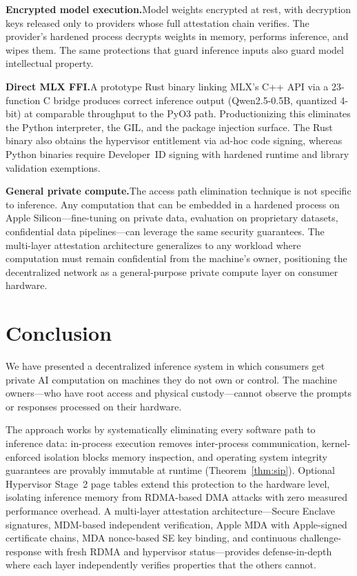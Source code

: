 \documentclass[10pt,twocolumn,letterpaper]{article}
\begin{document}
\textbf{Encrypted model execution.}\quad Model weights encrypted at rest, with decryption keys released only to providers whose full attestation chain verifies. The provider's hardened process decrypts weights in memory, performs inference, and wipes them. The same protections that guard inference inputs also guard model intellectual property.

\textbf{Direct MLX FFI.}\quad A prototype Rust binary linking MLX's C++ API via a 23-function C bridge produces correct inference output (Qwen2.5-0.5B, quantized 4-bit) at comparable throughput to the PyO3 path. Productionizing this eliminates the Python interpreter, the GIL, and the package injection surface. The Rust binary also obtains the hypervisor entitlement via ad-hoc code signing, whereas Python binaries require Developer~ID signing with hardened runtime and library validation exemptions.

\textbf{General private compute.}\quad The access path elimination technique is not specific to inference. Any computation that can be embedded in a hardened process on Apple Silicon---fine-tuning on private data, evaluation on proprietary datasets, confidential data pipelines---can leverage the same security guarantees. The multi-layer attestation architecture generalizes to any workload where computation must remain confidential from the machine's owner, positioning the decentralized network as a general-purpose private compute layer on consumer hardware.

\section{Conclusion}
\label{sec:conclusion}

We have presented a decentralized inference system in which consumers get private AI computation on machines they do not own or control. The machine owners---who have root access and physical custody---cannot observe the prompts or responses processed on their hardware.

The approach works by systematically eliminating every software path to inference data: in-process execution removes inter-process communication, kernel-enforced isolation blocks memory inspection, and operating system integrity guarantees are provably immutable at runtime (Theorem~\ref{thm:sip}). Optional Hypervisor Stage~2 page tables extend this protection to the hardware level, isolating inference memory from RDMA-based DMA attacks with zero measured performance overhead. A multi-layer attestation architecture---Secure Enclave signatures, MDM-based independent verification, Apple MDA with Apple-signed certificate chains, MDA nonce-based SE key binding, and continuous challenge-response with fresh RDMA and hypervisor status---provides defense-in-depth where each layer independently verifies properties that the others cannot.
\end{document}
